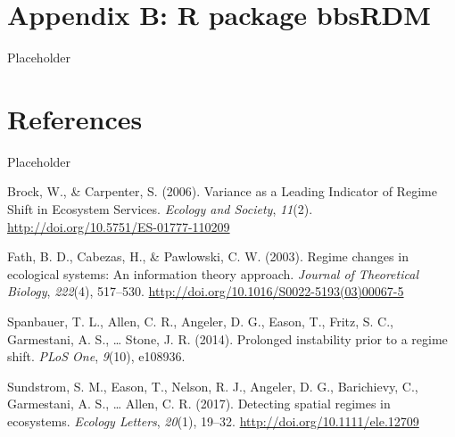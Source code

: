 \documentclass[12pt,twoside,openany]{reedthesis}
\begin{document}
\chapter*{Appendix B: R package bbsRDM}\label{bbsRDM}

Placeholder

\chapter*{References}\label{references}

Placeholder

\hypertarget{refs}{}
\hypertarget{ref-brock_variance_2006}{}
Brock, W., \& Carpenter, S. (2006). Variance as a Leading Indicator of
Regime Shift in Ecosystem Services. \emph{Ecology and Society},
\emph{11}(2). \url{http://doi.org/10.5751/ES-01777-110209}

\hypertarget{ref-fath_regime_2003}{}
Fath, B. D., Cabezas, H., \& Pawlowski, C. W. (2003). Regime changes in
ecological systems: An information theory approach. \emph{Journal of
Theoretical Biology}, \emph{222}(4), 517--530.
\url{http://doi.org/10.1016/S0022-5193(03)00067-5}

\hypertarget{ref-spanbauer_prolonged_2014}{}
Spanbauer, T. L., Allen, C. R., Angeler, D. G., Eason, T., Fritz, S. C.,
Garmestani, A. S., \ldots{} Stone, J. R. (2014). Prolonged instability
prior to a regime shift. \emph{PLoS One}, \emph{9}(10), e108936.

\hypertarget{ref-sundstrom2017detecting}{}
Sundstrom, S. M., Eason, T., Nelson, R. J., Angeler, D. G., Barichievy,
C., Garmestani, A. S., \ldots{} Allen, C. R. (2017). Detecting spatial
regimes in ecosystems. \emph{Ecology Letters}, \emph{20}(1), 19--32.
\url{http://doi.org/10.1111/ele.12709}
\end{document}
